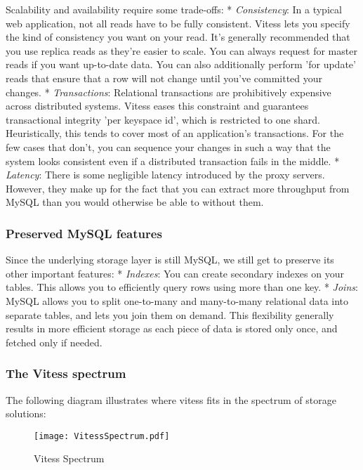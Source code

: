 Scalability and availability require some trade-offs:
* \emph{Consistency}: In a typical web application, not all reads have to be
fully consistent.
Vitess lets you specify the kind of consistency you want on your read.
It's generally recommended that you use replica reads as they're easier to scale.
You can always request for master reads if you want up-to-date data.
You can also additionally perform 'for update' reads that ensure that
a row will not change until you've committed your changes.
* \emph{Transactions}: Relational transactions are prohibitively expensive
across distributed systems.
Vitess eases this constraint and guarantees transactional integrity
'per keyspace id', which is restricted to one shard.
Heuristically, this tends to cover most of an application's transactions.
For the few cases that don't, you can sequence your changes in such a way
that the system looks consistent even if a distributed transaction fails
in the middle.
* \emph{Latency}: There is some negligible latency introduced by the proxy servers.
However, they make up for the fact that you can extract more throughput from
MySQL than you would otherwise be able to without them.

\subsubsection{Preserved MySQL features}\hypertarget{preserved-mysql-features}{}\label{preserved-mysql-features}

Since the underlying storage layer is still MySQL, we still get to preserve
its other important features:
* \emph{Indexes}: You can create secondary indexes on your tables. This allows you
to efficiently query rows using more than one key.
* \emph{Joins}:  MySQL allows you to split one-to-many and many-to-many relational data
into separate tables, and lets you join them on demand.
This flexibility generally results in more efficient storage as each piece of
data is stored only once, and fetched only if needed.

\subsubsection{The Vitess spectrum}\hypertarget{the-vitess-spectrum}{}\label{the-vitess-spectrum}

The following diagram illustrates where vitess fits in the spectrum of storage solutions:

\begin{figure}[H]
\caption{Vitess Spectrum}
\label{fig:Vitess Spectrum}
\begin{center}
\texttt{[image: VitessSpectrum.pdf]}
\end{center}
\end{figure}




